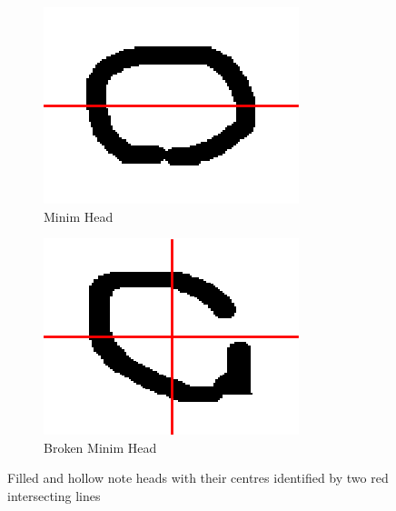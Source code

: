 \begin{figure}[H]
    \begin{subfigure}[b]{.3\linewidth}
        \centering
        \includegraphics[width=\linewidth]{gfx/techniques/scoring/note-head/1818-centroid-centre.png}
        \caption{Minim Head}
    \end{subfigure}
    \begin{subfigure}[b]{.3\linewidth}
        \centering
        \includegraphics[width=\linewidth]{gfx/techniques/scoring/note-head/6105-centroid-centre.png}
        \caption{Broken Minim Head}
        \label{fig:broken-minim}
    \end{subfigure}

  \caption{Filled and hollow note heads with their centres identified by two red intersecting lines}
  \label{fig:ccl-two-pass}
\end{figure}

